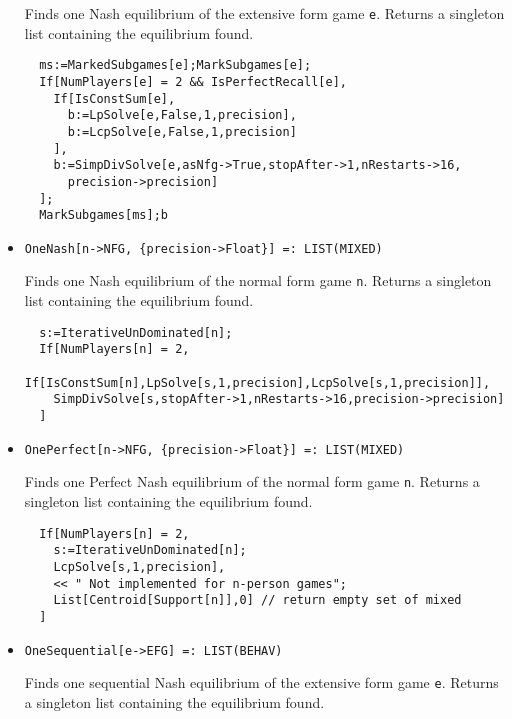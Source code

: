 \begin{itemize}
\bd 
Finds one Nash equilibrium of the extensive form game \verb+e+.
Returns a singleton list containing the equilibrium found.

\begin{verbatim}
  ms:=MarkedSubgames[e];MarkSubgames[e];
  If[NumPlayers[e] = 2 && IsPerfectRecall[e],
    If[IsConstSum[e],
      b:=LpSolve[e,False,1,precision],
      b:=LcpSolve[e,False,1,precision]
    ],
    b:=SimpDivSolve[e,asNfg->True,stopAfter->1,nRestarts->16,
      precision->precision]
  ];
  MarkSubgames[ms];b
\end{verbatim} 
\ed

\item{}
\protect \large \begin{verbatim}
OneNash[n->NFG, {precision->Float}] =: LIST(MIXED) 
\end{verbatim}\normalsize

\bd 
Finds one Nash equilibrium of the normal form game \verb+n+.
Returns a singleton list containing the equilibrium found.

\begin{verbatim}
  s:=IterativeUnDominated[n];
  If[NumPlayers[n] = 2,
    If[IsConstSum[n],LpSolve[s,1,precision],LcpSolve[s,1,precision]],
    SimpDivSolve[s,stopAfter->1,nRestarts->16,precision->precision]
  ]
\end{verbatim} 
\ed

\item{}
\protect \large \begin{verbatim}
OnePerfect[n->NFG, {precision->Float}] =: LIST(MIXED) 
\end{verbatim}\normalsize

\bd 
Finds one Perfect Nash equilibrium of the normal form game
\verb+n+.  Returns a singleton list containing the equilibrium found.

\begin{verbatim}
  If[NumPlayers[n] = 2, 
    s:=IterativeUnDominated[n];
    LcpSolve[s,1,precision],
    << " Not implemented for n-person games";
    List[Centroid[Support[n]],0] // return empty set of mixed
  ]
\end{verbatim} 
\ed

\item{}
\protect \large \begin{verbatim}
OneSequential[e->EFG] =: LIST(BEHAV) 
\end{verbatim}\normalsize

\bd 
Finds one sequential Nash equilibrium of the extensive form game
\verb+e+.  Returns a singleton list containing the equilibrium found.


\end{itemize}
